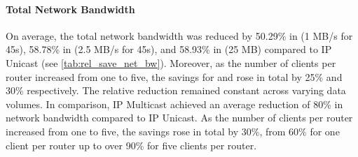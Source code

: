 \paragraph{Total Network Bandwidth} %
On average, the total network bandwidth was reduced by
    50.29\% in  (1 MB/s for 45s),
    58.78\% in  (2.5 MB/s for 45s), and
    58.93\% in  (25 MB)
    compared to IP Unicast (see \autoref{tab:rel_save_net_bw}).
Moreover, as the number of clients per router increased from one to five, the
    savings for 
    \uci{} and
    \ucii{}
    rose in total by 25\%  and 30\% respectively.
The relative reduction remained constant across varying data volumes.
In comparison, IP Multicast achieved an average reduction of 80\% in network
    bandwidth compared to IP Unicast.
As the number of clients per router increased from one to five, the savings
    rose in total by 30\%, from 60\% for one client per router up to over
    90\% for five clients per router.

